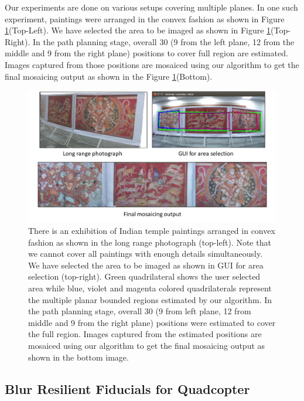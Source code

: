 Our experiments are done on various setups covering multiple planes.
In one such experiment, paintings were arranged in the convex
fashion as shown in Figure \ref{fig:multiplanar_result}(Top-Left). We have selected
the area to be imaged as shown in Figure \ref{fig:multiplanar_result}(Top-Right). In
the path planning stage, overall 30 (9 from the left plane, 12 from the middle
and 9 from the right plane) positions to cover full region are estimated.  Images
captured from those positions are mosaiced using our algorithm to get the final
mosaicing output as shown in the Figure \ref{fig:multiplanar_result}(Bottom).
\begin{figure}[h!]
	\centering
	\includegraphics[width=0.98\linewidth]{figures/multiplanar/convexResult}
	\caption[Result: Imaging Convex Surface ]{There is an exhibition of Indian
	temple paintings arranged in convex fashion as shown in the long range photograph (top-left). Note that we
cannot cover all paintings with enough details simultaneously. We have selected
the area to be imaged as shown in GUI for area selection (top-right).
Green quadrilateral shows the user selected area while blue, violet and magenta
colored quadrilaterals represent the multiple planar bounded regions
estimated by our algorithm. In the path planning stage, overall 30 (9 from left
plane, 12 from middle and 9 from the right plane) positions were estimated to cover
the full region. Images captured from the estimated positions are mosaiced using
our algorithm to get the final mosaicing output as shown in the bottom image.}	
	\label{fig:multiplanar_result}
\end{figure}
	
\subsection{Blur Resilient Fiducials for Quadcopter}

